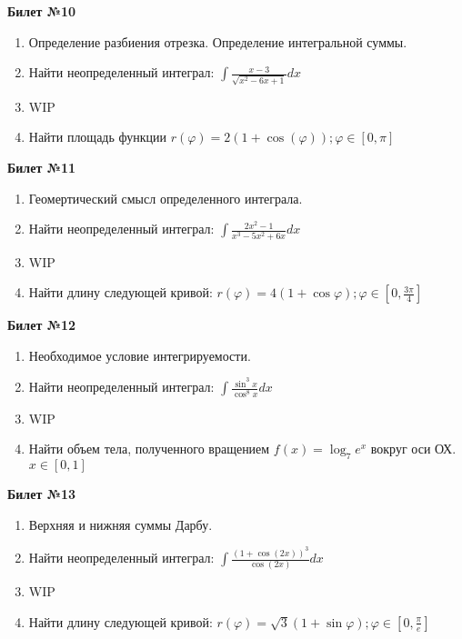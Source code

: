 \documentclass[a4paper, 12pt]{article}
\begin{document}
\begin{center}
	\textbf{Билет №10}
\end{center}
\begin{enumerate}
	\item Определение разбиения отрезка. Определение интегральной суммы.
	\item Найти неопределенный интеграл: $\displaystyle \int{\frac{x - 3}{\sqrt{x^2 - 6x + 1}} dx}$
	\item WIP
	\item Найти площадь функции $\displaystyle r(\varphi) = 2(1+\cos(\varphi)); \varphi \in \left[0,\pi\right]$
\end{enumerate}

\begin{center}
	\textbf{Билет №11}
\end{center}
\begin{enumerate}
	\item Геомертический смысл определенного интеграла.
	\item Найти неопределенный интеграл: $\displaystyle \int{\frac{2x^2 - 1}{x^3 - 5x^2 +6x} dx}$
	\item WIP
	\item Найти длину следующей кривой: $\displaystyle r(\varphi) = 4(1+\cos{\varphi}); \varphi \in \left[0, \frac{3\pi}{4}\right]$
\end{enumerate}

\begin{center}
	\textbf{Билет №12}
\end{center}
\begin{enumerate}
	\item Необходимое условие интегрируемости.
	\item Найти неопределенный интеграл: $\displaystyle \int{\frac{\sin^3 x}{\cos^8 x} dx}$
	\item WIP
	\item Найти объем тела, полученного вращением $\displaystyle f(x)=\log_{7}{e^x}$ вокруг оси ОХ. $x \in \left[0,1\right]$
\end{enumerate}

\begin{center}
	\textbf{Билет №13}
\end{center}
\begin{enumerate}
	\item Верхняя и нижняя суммы Дарбу.
	\item Найти неопределенный интеграл: $\displaystyle \int{\frac{(1 + \cos(2x))^3}{\cos(2x)}dx}$
	\item WIP
	\item Найти длину следующей кривой: $\displaystyle r(\varphi) = \sqrt{3}(1+\sin{\varphi}); \varphi \in \left[0, \frac{\pi}{e}\right]$
\end{enumerate}
\end{document}
